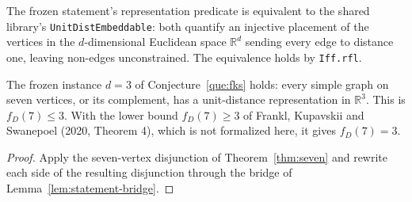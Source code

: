 \begin{lemma}
  \label{lem:statement-bridge}
  \leanok
  The frozen statement's representation predicate is equivalent to the shared library's
  \texttt{UnitDistEmbeddable}: both quantify an injective placement of the vertices in the
  $d$-dimensional Euclidean space $\mathbb{R}^d$ sending every edge to distance one, leaving
  non-edges unconstrained. The equivalence holds by \texttt{Iff.rfl}.
\end{lemma}

\begin{theorem}
  \label{thm:question-at-three}
  \leanok
  The frozen instance $d = 3$ of Conjecture~\ref{que:fks} holds: every simple graph on seven
  vertices, or its complement, has a unit-distance representation in $\mathbb{R}^3$.
  This is $f_D(7) \le 3$. With the lower bound $f_D(7) \ge 3$ of Frankl, Kupavskii and Swanepoel (2020, Theorem 4), which is
  not formalized here, it gives $f_D(7) = 3$.
\end{theorem}
\begin{proof}
  Apply the seven-vertex disjunction of Theorem~\ref{thm:seven} and rewrite each side of the
  resulting disjunction through the bridge of Lemma~\ref{lem:statement-bridge}.
\end{proof}
